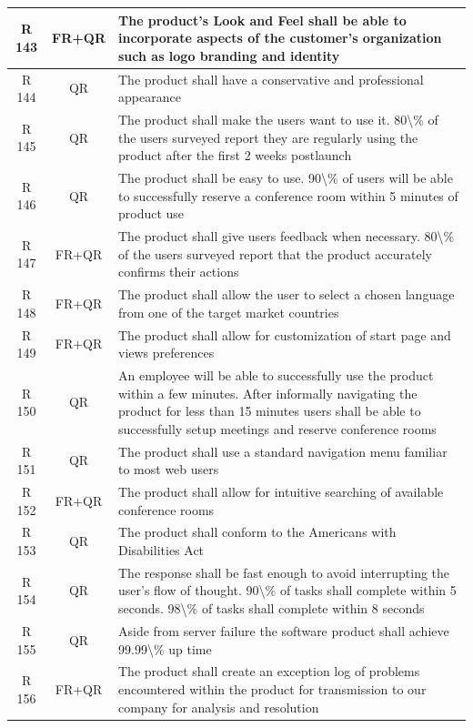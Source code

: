 \documentclass[dissertation,final]{softeng}
\begin{document}
\begin{appendices}
\begin{center}
\begin{longtable}{c c m{}}
    R 143   & FR+QR & The product's Look and Feel shall be able to incorporate aspects of the customer's organization such as logo branding and identity \\*    \midrule
    R 144   & QR & The product shall have a conservative and professional appearance \\    \midrule
    R 145   & QR & The product shall make the users want to use it. 80\textbackslash{}\% of the users surveyed report they are regularly using the product after the first 2 weeks postlaunch \\    \midrule
    R 146   & QR & The product shall be easy to use. 90\textbackslash{}\% of users will be able to successfully reserve a conference room within 5 minutes of product use \\*    \midrule
    R 147   & FR+QR & The product shall give users feedback when necessary. 80\textbackslash{}\% of the users surveyed report that the product accurately confirms their actions \\    \midrule
    R 148   & FR+QR & The product shall allow the user to select a chosen language from one of the target market countries \\ \midrule
    R 149   & FR+QR & The product shall allow for customization of start page and views preferences \\    \midrule
    R 150   & QR & An employee will be able to successfully use the product within a few minutes. After informally navigating the product for less than 15 minutes users shall be able to successfully setup meetings and reserve conference rooms \\    \midrule
    R 151   & QR & The product shall use a standard navigation menu familiar to most web users \\    \midrule
    R 152   & FR+QR & The product shall allow for intuitive searching of available conference rooms \\    \midrule
    R 153   & QR & The product shall conform to the Americans with Disabilities Act \\    \midrule
    R 154   & QR & The response shall be fast enough to avoid interrupting the user's flow of thought. 90\textbackslash{}\% of tasks shall complete within 5 seconds. 98\textbackslash{}\% of tasks shall complete within 8 seconds \\    \midrule
    R 155   & QR & Aside from server failure the software product shall achieve 99.99\textbackslash{}\% up time \\    \midrule
    R 156   & FR+QR &  The product shall create an exception log of problems encountered within the product for transmission to our company for analysis and resolution \\    \midrule

\end{longtable}
\end{center}
\end{appendices}
\end{document}
